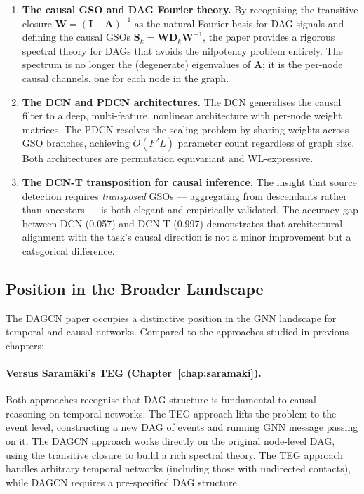 \begin{enumerate}
    \item \textbf{The causal GSO and DAG Fourier theory.} By recognising the
          transitive closure $\mathbf{W} = (\mathbf{I} - \mathbf{A})^{-1}$ as the
          natural Fourier basis for DAG signals and defining the causal GSOs
          $\mathbf{S}_k = \mathbf{W}\mathbf{D}_k\mathbf{W}^{-1}$, the paper
          provides a rigorous spectral theory for DAGs that avoids the nilpotency
          problem entirely. The spectrum is no longer the (degenerate) eigenvalues
          of $\mathbf{A}$; it is the per-node causal channels, one for each node
          in the graph.

    \item \textbf{The DCN and PDCN architectures.} The DCN generalises the
          causal filter to a deep, multi-feature, nonlinear architecture with
          per-node weight matrices. The PDCN resolves the scaling problem by
          sharing weights across GSO branches, achieving $O(F^2L)$ parameter
          count regardless of graph size. Both architectures are permutation
          equivariant and WL-expressive.

    \item \textbf{The DCN-T transposition for causal inference.} The insight
          that source detection requires \emph{transposed} GSOs --- aggregating
          from descendants rather than ancestors --- is both elegant and
          empirically validated. The accuracy gap between DCN (0.057) and DCN-T
          (0.997) demonstrates that architectural alignment with the task's
          causal direction is not a minor improvement but a categorical difference.
\end{enumerate}

\subsection{Position in the Broader Landscape}

The DAGCN paper occupies a distinctive position in the GNN landscape for
temporal and causal networks. Compared to the approaches studied in previous
chapters:

\paragraph{Versus Saram\"{a}ki's TEG (Chapter~\ref{chap:saramaki}).} Both
approaches recognise that DAG structure is fundamental to causal reasoning on
temporal networks. The TEG approach lifts the problem to the event level,
constructing a new DAG of events and running GNN message passing on it. The
DAGCN approach works directly on the original node-level DAG, using the
transitive closure to build a rich spectral theory. The TEG approach handles
arbitrary temporal networks (including those with undirected contacts), while
DAGCN requires a pre-specified DAG structure.

